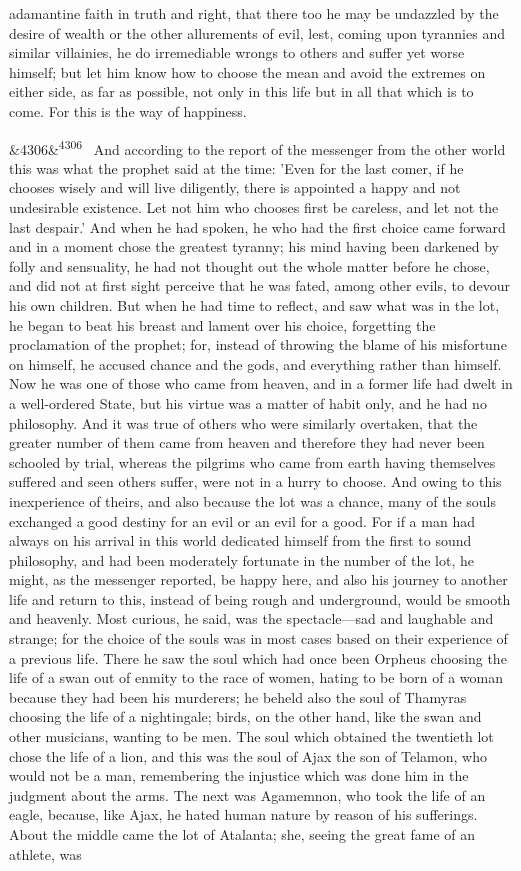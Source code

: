\documentclass[12pt]{article}
\newcommand{\para}[1][]{\par\noindent\ifx&#1&\else\textsuperscript{\footnotesize #1}~\fi}
\begin{document}
adamantine faith in truth and right, that there too he may be undazzled by the desire of wealth or the other allurements of evil, lest, coming upon tyrannies and similar villainies, he do irremediable wrongs to others and suffer yet worse himself; but let him know how to choose the mean and avoid the extremes on either side, as far as possible, not only in this life but in all that which is to come. For this is the way of happiness.

\para[4306] And according to the report of the messenger from the other world this was what the prophet said at the time: 'Even for the last comer, if he chooses wisely and will live diligently, there is appointed a happy and not undesirable existence. Let not him who chooses first be careless, and let not the last despair.' And when he had spoken, he who had the first choice came forward and in a moment chose the greatest tyranny; his mind having been darkened by folly and sensuality, he had not thought out the whole matter before he chose, and did not at first sight perceive that he was fated, among other evils, to devour his own children. But when he had time to reflect, and saw what was in the lot, he began to beat his breast and lament over his choice, forgetting the proclamation of the prophet; for, instead of throwing the blame of his misfortune on himself, he accused chance and the gods, and everything rather than himself. Now he was one of those who came from heaven, and in a former life had dwelt in a well-ordered State, but his virtue was a matter of habit only, and he had no philosophy. And it was true of others who were similarly overtaken, that the greater number of them came from heaven and therefore they had never been schooled by trial, whereas the pilgrims who came from earth having themselves suffered and seen others suffer, were not in a hurry to choose. And owing to this inexperience of theirs, and also because the lot was a chance, many of the souls exchanged a good destiny for an evil or an evil for a good. For if a man had always on his arrival in this world dedicated himself from the first to sound philosophy, and had been moderately fortunate in the number of the lot, he might, as the messenger reported, be happy here, and also his journey to another life and return to this, instead of being rough and underground, would be smooth and heavenly. Most curious, he said, was the spectacle---sad and laughable and strange; for the choice of the souls was in most cases based on their experience of a previous life. There he saw the soul which had once been Orpheus choosing the life of a swan out of enmity to the race of women, hating to be born of a woman because they had been his murderers; he beheld also the soul of Thamyras choosing the life of a nightingale; birds, on the other hand, like the swan and other musicians, wanting to be men. The soul which obtained the twentieth lot chose the life of a lion, and this was the soul of Ajax the son of Telamon, who would not be a man, remembering the injustice which was done him in the judgment about the arms. The next was Agamemnon, who took the life of an eagle, because, like Ajax, he hated human nature by reason of his sufferings. About the middle came the lot of Atalanta; she, seeing the great fame of an athlete, was 
\end{document}
